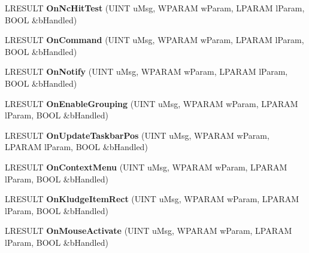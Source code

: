 \begin{DoxyCompactItemize}
\mbox{\label{class_c_task_switch_wnd_adcfaa39189d111cdd46be1647d2f3127}} 
L\+R\+E\+S\+U\+LT {\bfseries On\+Nc\+Hit\+Test} (U\+I\+NT u\+Msg, W\+P\+A\+R\+AM w\+Param, L\+P\+A\+R\+AM l\+Param, B\+O\+OL \&b\+Handled)
\item 
\mbox{\label{class_c_task_switch_wnd_a54394d30a84908e6e4be4801621aa65f}} 
L\+R\+E\+S\+U\+LT {\bfseries On\+Command} (U\+I\+NT u\+Msg, W\+P\+A\+R\+AM w\+Param, L\+P\+A\+R\+AM l\+Param, B\+O\+OL \&b\+Handled)
\item 
\mbox{\label{class_c_task_switch_wnd_a0e8c9ab95ce752ddb5df451721a683be}} 
L\+R\+E\+S\+U\+LT {\bfseries On\+Notify} (U\+I\+NT u\+Msg, W\+P\+A\+R\+AM w\+Param, L\+P\+A\+R\+AM l\+Param, B\+O\+OL \&b\+Handled)
\item 
\mbox{\label{class_c_task_switch_wnd_afada35e75c570eae174acaf02e564aa9}} 
L\+R\+E\+S\+U\+LT {\bfseries On\+Enable\+Grouping} (U\+I\+NT u\+Msg, W\+P\+A\+R\+AM w\+Param, L\+P\+A\+R\+AM l\+Param, B\+O\+OL \&b\+Handled)
\item 
\mbox{\label{class_c_task_switch_wnd_ae6f20cb5da7ba9bda286a993ce9a23b2}} 
L\+R\+E\+S\+U\+LT {\bfseries On\+Update\+Taskbar\+Pos} (U\+I\+NT u\+Msg, W\+P\+A\+R\+AM w\+Param, L\+P\+A\+R\+AM l\+Param, B\+O\+OL \&b\+Handled)
\item 
\mbox{\label{class_c_task_switch_wnd_a141a0bf4d6d51caac7e03e953fa7849a}} 
L\+R\+E\+S\+U\+LT {\bfseries On\+Context\+Menu} (U\+I\+NT u\+Msg, W\+P\+A\+R\+AM w\+Param, L\+P\+A\+R\+AM l\+Param, B\+O\+OL \&b\+Handled)
\item 
\mbox{\label{class_c_task_switch_wnd_a956f624b4ef3c4a1dcdc935af3ec8460}} 
L\+R\+E\+S\+U\+LT {\bfseries On\+Kludge\+Item\+Rect} (U\+I\+NT u\+Msg, W\+P\+A\+R\+AM w\+Param, L\+P\+A\+R\+AM l\+Param, B\+O\+OL \&b\+Handled)
\item 
\mbox{\label{class_c_task_switch_wnd_a78b9ed8756d75118c0d51dbcd2889b40}} 
L\+R\+E\+S\+U\+LT {\bfseries On\+Mouse\+Activate} (U\+I\+NT u\+Msg, W\+P\+A\+R\+AM w\+Param, L\+P\+A\+R\+AM l\+Param, B\+O\+OL \&b\+Handled)

\end{DoxyCompactItemize}

